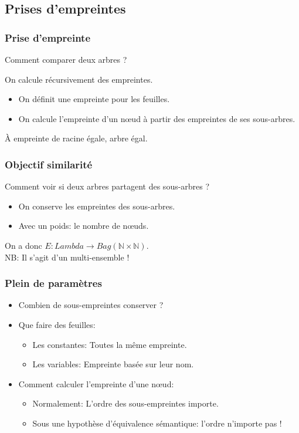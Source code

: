 \documentclass[11pt]{beamer}
\begin{document}
\subsection{Prises d'empreintes}
\begin{frame}
	\frametitle{Prise d'empreinte}
	Comment comparer deux arbres ?
	
	\pause
	
	On calcule \alert{récursivement} des empreintes.
	\pause
	
	\begin{itemize}
		\item On définit une empreinte pour les feuilles.
		\item On calcule l'empreinte d'un nœud à partir des empreintes de ses sous-arbres.
	\end{itemize}
	
	\pause
	À empreinte de racine égale, arbre égal.
	
\end{frame}

\begin{frame}
	\frametitle{Objectif similarité}
	Comment voir si deux arbres partagent des sous-arbres ?
	
	\begin{itemize}
		\item On conserve les empreintes des sous-arbres.
		\item Avec un poids: le nombre de nœuds.
	\end{itemize}

On a donc $E : Lambda \to Bag(\mathbb{N} \times \mathbb{N})$.\\
NB: Il s'agit d'un multi-ensemble !
\end{frame}

\begin{frame}
\tiny
\end{frame}

\begin{frame}
	\frametitle{Plein de paramètres}
	
	\begin{itemize}
		\item Combien de sous-empreintes conserver ?
		\item Que faire des feuilles:
		\begin{itemize}
			\item Les constantes: Toutes la même empreinte.
			\item Les variables: Empreinte basée sur leur nom.
		\end{itemize}
		\item Comment calculer l'empreinte d'une nœud:
		\begin{itemize}
			\item Normalement: L'ordre des sous-empreintes importe.
			\item Sous une hypothèse d'équivalence sémantique: l'ordre n'importe pas !
		\end{itemize}
	\end{itemize}
\end{frame}
\end{document}
